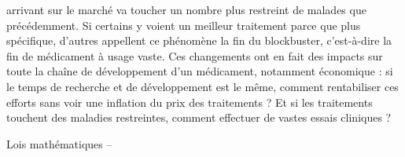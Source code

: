 \begin{leftbubbles}
arrivant sur le marché va toucher un nombre plus restreint de malades que précédemment. Si certains y voient un meilleur traitement parce que plus spécifique, d’autres appellent ce phénomène la fin du blockbuster, c’est-à-dire la fin de médicament à usage vaste. Ces changements ont en fait des impacts sur toute la chaîne de développement d’un médicament, notamment économique : si le temps de recherche et de développement est le même, comment rentabiliser ces efforts sans voir une inflation du prix des traitements ? Et si les traitements touchent des maladies restreintes, comment effectuer de vastes essais cliniques ?\\
\end{leftbubbles} \begin{rightbubbles}
Lois mathématiques --\\
\end{rightbubbles}